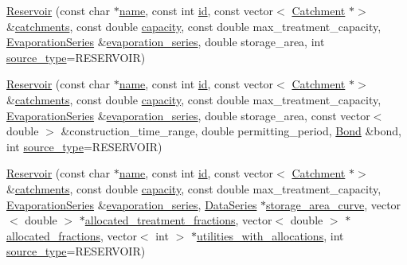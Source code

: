 \begin{DoxyCompactItemize}
\mbox{\hyperlink{classReservoir_a0a1041fc72df190bbc51d965ede96f49}{Reservoir}} (const char $\ast$\mbox{\hyperlink{classWaterSource_a846ea74c5b453d014f594d41fee8c765}{name}}, const int \mbox{\hyperlink{classWaterSource_a6eafe5dfefd317877d1244e8a7c6e742}{id}}, const vector$<$ \mbox{\hyperlink{classCatchment}{Catchment}} $\ast$$>$ \&\mbox{\hyperlink{classWaterSource_a8c18c34f23f8a06685c1d12f462ed830}{catchments}}, const double \mbox{\hyperlink{classWaterSource_a2ec257b415b248214a8bce7fc5267723}{capacity}}, const double max\+\_\+treatment\+\_\+capacity, \mbox{\hyperlink{classEvaporationSeries}{Evaporation\+Series}} \&\mbox{\hyperlink{classReservoir_a2d2d9b302c13703309bb798d24136810}{evaporation\+\_\+series}}, double storage\+\_\+area, int \mbox{\hyperlink{classWaterSource_afdd12c29fc74ea21dff1f1be9b8c2b7b}{source\+\_\+type}}=R\+E\+S\+E\+R\+V\+O\+IR)
\item 
\mbox{\hyperlink{classReservoir_a56409325d4554f8ef32a9c3605ece5c8}{Reservoir}} (const char $\ast$\mbox{\hyperlink{classWaterSource_a846ea74c5b453d014f594d41fee8c765}{name}}, const int \mbox{\hyperlink{classWaterSource_a6eafe5dfefd317877d1244e8a7c6e742}{id}}, const vector$<$ \mbox{\hyperlink{classCatchment}{Catchment}} $\ast$$>$ \&\mbox{\hyperlink{classWaterSource_a8c18c34f23f8a06685c1d12f462ed830}{catchments}}, const double \mbox{\hyperlink{classWaterSource_a2ec257b415b248214a8bce7fc5267723}{capacity}}, const double max\+\_\+treatment\+\_\+capacity, \mbox{\hyperlink{classEvaporationSeries}{Evaporation\+Series}} \&\mbox{\hyperlink{classReservoir_a2d2d9b302c13703309bb798d24136810}{evaporation\+\_\+series}}, double storage\+\_\+area, const vector$<$ double $>$ \&construction\+\_\+time\+\_\+range, double permitting\+\_\+period, \mbox{\hyperlink{classBond}{Bond}} \&bond, int \mbox{\hyperlink{classWaterSource_afdd12c29fc74ea21dff1f1be9b8c2b7b}{source\+\_\+type}}=R\+E\+S\+E\+R\+V\+O\+IR)
\item 
\mbox{\hyperlink{classReservoir_a1a6f078a9565dcb65843d3575bdd4172}{Reservoir}} (const char $\ast$\mbox{\hyperlink{classWaterSource_a846ea74c5b453d014f594d41fee8c765}{name}}, const int \mbox{\hyperlink{classWaterSource_a6eafe5dfefd317877d1244e8a7c6e742}{id}}, const vector$<$ \mbox{\hyperlink{classCatchment}{Catchment}} $\ast$$>$ \&\mbox{\hyperlink{classWaterSource_a8c18c34f23f8a06685c1d12f462ed830}{catchments}}, const double \mbox{\hyperlink{classWaterSource_a2ec257b415b248214a8bce7fc5267723}{capacity}}, const double max\+\_\+treatment\+\_\+capacity, \mbox{\hyperlink{classEvaporationSeries}{Evaporation\+Series}} \&\mbox{\hyperlink{classReservoir_a2d2d9b302c13703309bb798d24136810}{evaporation\+\_\+series}}, \mbox{\hyperlink{classDataSeries}{Data\+Series}} $\ast$\mbox{\hyperlink{classReservoir_a46bd5b750963dfa9a57b247fd77ab8ff}{storage\+\_\+area\+\_\+curve}}, vector$<$ double $>$ $\ast$\mbox{\hyperlink{classWaterSource_aa73fe10cfc6579b2fb79529e1dde5140}{allocated\+\_\+treatment\+\_\+fractions}}, vector$<$ double $>$ $\ast$\mbox{\hyperlink{classWaterSource_a2f6655a80c4847fe039987255d9d998c}{allocated\+\_\+fractions}}, vector$<$ int $>$ $\ast$\mbox{\hyperlink{classWaterSource_ac345583fc2d0f7e1db31ee40244d7ace}{utilities\+\_\+with\+\_\+allocations}}, int \mbox{\hyperlink{classWaterSource_afdd12c29fc74ea21dff1f1be9b8c2b7b}{source\+\_\+type}}=R\+E\+S\+E\+R\+V\+O\+IR)
$$
\end{DoxyCompactItemize}
